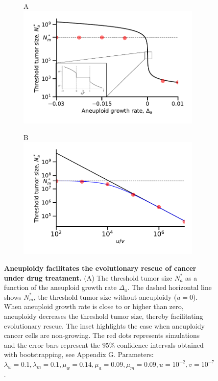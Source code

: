 \documentclass[12pt]{extarticle}
\begin{document}
\begin{figure}
\begin{subfigure}{0.5\textwidth}
A\\
\includegraphics[width=1\textwidth]{Figures/ThresholdPopulationSizePlot.pdf}
\end{subfigure}
\begin{subfigure}{0.5\textwidth}
B\\
\includegraphics[width=1\textwidth]{Figures/ThresholdPopulationSizeVersusRatioPlot.pdf}
\end{subfigure}
\caption{
\textbf{Aneuploidy facilitates the evolutionary rescue of cancer under drug treatment.}
(A) The threshold tumor size $N_a^*$ as a function of the aneuploid growth rate $\Delta_a$. The dashed horizontal line shows $N^*_m$, the threshold tumor size without aneuploidy ($u=0$).  When aneuploid growth rate is close to or higher than zero, aneuploidy decreases the threshold tumor size, thereby facilitating evolutionary rescue. The inset highlights the case when aneuploidy cancer cells are non-growing. The red dots represents simulations and the error bars represent the $95\%$ confidence intervals obtained with bootstrapping, see Appendix G. Parameters: $\lambda_w=0.1,\lambda_m=0.1,\mu_w=0.14,\mu_a=0.09,\mu_m=0.09, u=10^{-2}, v=10^{-7}$.
}
\end{figure}
\end{document}

